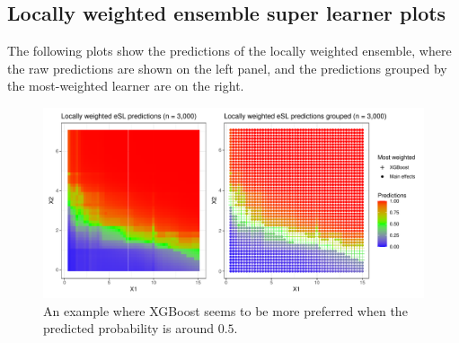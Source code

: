 \documentclass[11pt, a4paper]{article}
\theoremstyle{definition}
\theoremstyle{remark}
\begin{document}
\subsection{Locally weighted ensemble super learner plots}
The following plots show the predictions of the locally weighted ensemble, where the raw predictions are shown on the left panel, and the predictions grouped by the most-weighted learner are on the right. 
\begin{figure}[H]
    \centering
    \centerline{\includegraphics[width=1.2\textwidth]{figures/esl_preds_lw_stratified_tiled2.pdf}}
    \caption{An example where XGBoost seems to be more preferred when the predicted probability is around $ 0.5 $.}
    \label{fig:esl_preds_lw_stratified_tiled2}
\end{figure}
\end{document}
